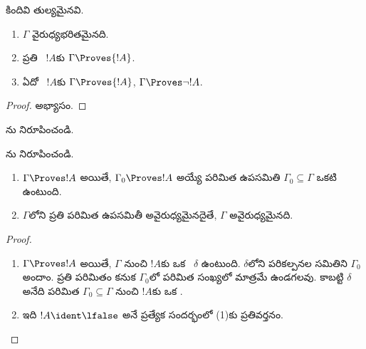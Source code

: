 \documentclass[../../../include/open-logic-section]{subfiles}
\begin{document}
\begin{prop}
కిందివి తుల్యమైనవి.
    \begin{enumerate}
      \item \( \Gamma \) వైరుధ్యభరితమైనది.
      \item ప్రతి ~\( {!A} \)కు \( \Gamma \Proves {!A} \).
      \item ఏదో ~\( {!A} \)కు \( \Gamma \Proves {!A} \), \( \Gamma \Proves \lnot {!A} \).
    \end{enumerate}
\end{prop}

\begin{proof}
అభ్యాసం.
\end{proof}

\begin{prob}
ను నిరూపించండి.
\end{prob}
\tagendprob

\begin{prob}
ను నిరూపించండి.
\end{prob}
\tagendprob

\begin{prop}[సంహతత్వం]
  \begin{enumerate}
  \item $\Gamma \Proves !A$ అయితే, $\Gamma_0 \Proves !A$ అయ్యే
    పరిమిత ఉపసమితి $\Gamma_0 \subseteq \Gamma$ ఒకటి ఉంటుంది.
  \item $\Gamma$లోని ప్రతి పరిమిత ఉపసమితీ అవైరుధ్యమైనదైతే,
    $\Gamma$ అవైరుధ్యమైనది.
  \end{enumerate}
\end{prop}

\begin{proof}
  \begin{enumerate}
    \item $\Gamma \Proves !A$ అయితే, $\Gamma$ నుంచి $!A$కు
      ఒక ~$\delta$ ఉంటుంది. $\delta$లోని
       పరికల్పనల సమితిని $\Gamma_0$ అందాం. ప్రతి
       పరిమితం కనుక $\Gamma_0$లో పరిమిత సంఖ్యలో మాత్రమే
       ఉండగలవు. కాబట్టి $\delta$ అనేది పరిమిత
      $\Gamma_0 \subseteq \Gamma$ నుంచి $!A$కు ఒక .
    \item ఇది $!A \ident \lfalse$ అనే ప్రత్యేక సందర్భంలో (1)కు
      ప్రతివర్తనం.
  \end{enumerate}
\end{proof}
\end{document}
